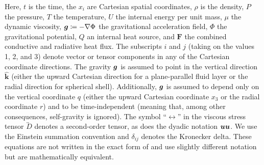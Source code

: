 \documentclass[12pt]{article}
\newcommand{\vecf}{\bm{F}}
\newcommand{\veck}{\hat{\bm{k}}}
\begin{document}
	Here, $t$ is the time, the $x_i$ are Cartesian spatial coordinates, $\rho$ is the density, $P$ the pressure, $T$ the temperature, $U$ the internal energy per unit mass, $\mu$ the dynamic viscosity, $\bm{g}\coloneqq -\nabla\Phi$ the gravitational acceleration field, $\Phi$ the gravitational potential, $Q$ an internal heat source, and $\vecf$ the combined conductive and radiative heat flux. The subscripts $i$ and $j$ (taking on the values 1, 2, and 3) denote vector or tensor components in any of the Cartesian coordinate directions. The gravity $\bm{g}$ is assumed to point in the vertical direction $\veck$ (either the upward Cartesian direction for a plane-parallel fluid layer or the radial direction for spherical shell). Additionally, $\bm{g}$ is assumed to depend only on the vertical coordinate $q$ (either the upward Cartesian coordinate $x_3$ or the radial coordinate $r$) and to be time-independent (meaning that, among other consequences, self-gravity is ignored). The symbol ``$\leftrightarrow$'' in the viscous stress tensor $\overleftrightarrow{D}$ denotes a second-order tensor, as does the dyadic notation $\bm{u}\bm{u}$.   We use the Einstein summation convention and $\delta_{ij}$ denotes the Kronecker delta. These equations are not written in the exact form of \citet{Gough1969} and use slightly different notation but are mathematically equivalent. 
	
\end{document}
